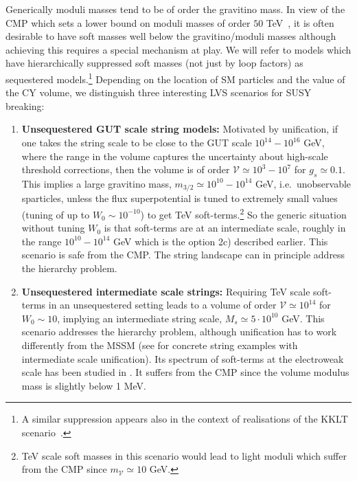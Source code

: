 \documentclass[11pt,a4paper]{article}
\newcommand\vo{{\mathcal{V}}}
\begin{document}
Generically moduli masses tend to be of order the gravitino mass.
In view of the CMP which sets a lower bound on moduli masses of order $50$ TeV~\cite{Coughlan:1983ci,Banks:1993en,deCarlos:1993jw},
it is often desirable to have soft masses well below the gravitino/moduli masses
although achieving this requires a special mechanism at play. We will refer to models which have hierarchically suppressed soft masses
(not just by loop factors) as sequestered models.\footnote{A similar suppression appears also in the context of realisations of the KKLT scenario~\cite{Choi:2005ge}.}
Depending on the location of SM particles and the value of the CY volume, we distinguish three interesting LVS scenarios for SUSY breaking:
\begin{enumerate}
\item{\bf Unsequestered GUT scale string models:}
Motivated by unification, if one takes the string scale to be close to the GUT scale $10^{14}-10^{16}$ GeV, where the range in the volume captures the uncertainty about high-scale threshold corrections,
then the volume is of order $\vo\simeq 10^{3}-10^{7}$ for $g_s\simeq 0.1$.
This implies a large gravitino mass, $m_{3/2}\simeq 10^{10}-10^{14}$ GeV, i.e.~unobservable sparticles,
unless the flux superpotential is tuned to extremely small values (tuning of up to $W_0\sim 10^{-10}$)
to get TeV soft-terms.\footnote{TeV scale soft masses in this scenario would lead to light moduli
which suffer from the CMP since $m_\vo \simeq 10$ GeV.}
So the generic situation without tuning $W_0$ is that soft-terms are at an intermediate scale, roughly in the range $10^{10}-10^{14}$ GeV which is the option 2c) described earlier.
This scenario is safe from the CMP. The string landscape can in principle address the hierarchy problem.

\item{\bf Unsequestered intermediate scale strings:}
Requiring TeV scale soft-terms in an unsequestered setting leads to a volume of order $\vo\simeq 10^{14}$ for $W_0\sim 10$,
implying an intermediate string scale, $M_s\simeq 5\cdot 10^{10}$ GeV.
This scenario addresses the hierarchy problem, although unification has to work differently from the MSSM (see \cite{Aldazabal:2000sk, 1106.6039,Cicoli:2013mpa}
for concrete string examples with intermediate scale unification). Its spectrum of soft-terms at the electroweak scale has been studied in \cite{Conlon:2007xv}.
It suffers from the CMP since the volume modulus mass is slightly below 1 MeV.


\end{enumerate}
\end{document}
